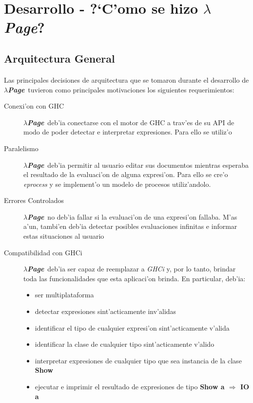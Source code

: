 \documentclass[a4paper]{article}
\newcommand{\hpage}{\textbf{\textsl{$\lambda$Page}}}
\begin{document}
\newpage
\section{Desarrollo - ?`C'omo se hizo \hpage?}
\subsection{Arquitectura General}
\begin{epigraphs}
\end{epigraphs}
\paragraph{}Las principales decisiones de arquitectura que se tomaron durante el desarrollo de \hpage\ tuvieron como principales motivaciones los siguientes requerimientos:
\begin{description}
\item[Conexi'on con GHC] \hpage\ deb'ia conectarse con el motor de GHC a trav'es de su API de modo de poder detectar e interpretar expresiones.  Para ello se utiliz'o ~\cite{hint}
\item[Paralelismo] \hpage\ deb'ia permitir al usuario editar sus documentos mientras esperaba el resultado de la evaluaci'on de alguna expresi'on.  Para ello se cre'o \textsl{eprocess} y se implement'o un modelo de procesos utiliz'andolo.
\item[Errores Controlados] \hpage\ no deb'ia fallar si la evaluaci'on de una expresi'on fallaba.  M'as a'un, tambi'en deb'ia detectar posibles evaluaciones infinitas e informar estas situaciones al usuario
\item[Compatibilidad con GHCi] \hpage\ deb'ia ser capaz de reemplazar a \textsl{GHCi} y, por lo tanto, brindar toda las funcionalidades que esta aplicaci'on brinda.  En particular, deb'ia:
	\begin{itemize}
		\item ser multiplataforma
		\item detectar expresiones sint'acticamente inv'alidas
		\item identificar el tipo de cualquier expresi'on sint'acticamente v'alida
		\item identificar la clase de cualquier tipo sint'acticamente v'alido
		\item interpretar expresiones de cualquier tipo que sea instancia de la clase \textbf{Show}
		\item ejecutar e imprimir el resultado de expresiones de tipo \textbf{Show a $\Rightarrow$ IO a}
	\end{itemize}
\end{description}
\end{document}
